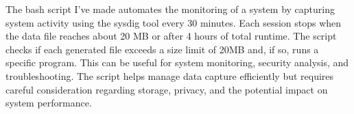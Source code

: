 The bash script I've made automates the monitoring of a system by capturing system activity using the sysdig tool every 30 minutes. Each session stops when the data file reaches about 20 MB or after 4 hours of total runtime. The script checks if each generated file exceeds a size limit of 20MB and, if so, runs a specific program. This can be useful for system monitoring, security analysis, and troubleshooting. The script helps manage data capture efficiently but requires careful consideration regarding storage, privacy, and the potential impact on system performance.
